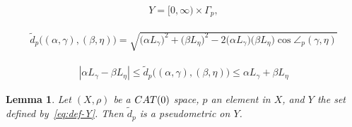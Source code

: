 \documentclass[10pt,a4paper]{amsart}
\newtheorem{lemma}{Lemma}
\newcommand{\CAT}{\textup{CAT}}
\providecommand{\abs}[1]{\left\lvert#1\right\rvert}
\begin{document}
\begin{align}\label{eq:def-Y}
 Y=[0,\infty)\times \Gamma_p, 
\end{align}

\begin{align}\label{eq:def-d_p-L}
 \tilde{d}_p\bigl((\alpha, \gamma), (\beta, \eta)\bigr) 
 =\sqrt{\bigl(\alpha L_{\gamma}\bigr)^2 
 +\bigl(\beta L_{\eta}\bigr)^2 
 -2\bigl(\alpha L_{\gamma}\bigr)\bigl(\beta L_{\eta}\bigr) \cos \angle_p(\gamma, \eta)}  
\end{align}

\begin{align}\label{eq:ineq-d_p}
 \abs{\alpha L_{\gamma} - \beta L_{\eta}} 
 \leq \tilde{d}_p\bigl((\alpha, \gamma), (\beta, \eta)\bigr) 
 \leq \alpha L_{\gamma} + \beta L_{\eta}
\end{align}

\begin{lemma}\label{lem:d_p-pm}
 Let $(X, \rho)$ be a $\CAT(0)$ space, 
 $p$ an element in $X$, and $Y$ the set defined by~\eqref{eq:def-Y}. 
 Then $\tilde{d}_p$ is a pseudometric 
 on $Y$. 
\end{lemma}
\end{document}
